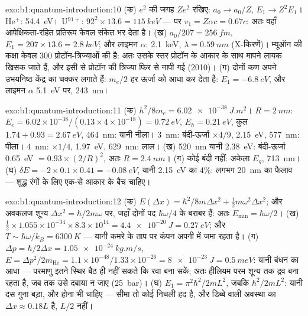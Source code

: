 \begin{solution}{exo:b1:quantum-introduction:10}
(क) $e^2$ की जगह $Ze^2$ रखिए: $a_0 \to a_0/Z$, $E_1 \to Z^2E_1$। He$^+$:
\qty{54.4}{eV}। U$^{91+}$: $92^2 \times 13.6 = \qty{115}{keV}$ --- पर $v_1 = Z\alpha c
= 0.67c$: अतः वहाँ आपेक्षिकता-रहित प्रतिरूप केवल संकेत भर देता है। (ख) $a_0/207
= \qty{256}{fm}$, $E_1 = 207 \times 13.6 = \qty{2.8}{keV}$; और लाइमन $\alpha$:
\qty{2.1}{keV}, $\lambda = \qty{0.59}{nm}$ (X-किरणें)। म्यूऑन की कक्षा केवल
$300$ प्रोटॉन-त्रिज्याओं की है: अतः उसके स्तर प्रोटॉन के आकार के साथ मापने
लायक खिसक जाते हैं, और इसी से प्रोटॉन की त्रिज्या फिर से नापी गई (2010)।
(ग) दोनों कण अपने उभयनिष्ठ केंद्र का चक्कर लगाते हैं: 
$m_e/2$ हर ऊर्जा को आधा कर देता है: $E_1 = \qty{-6.8}{eV}$, और लाइमन $\alpha$ \qty{5.1}{eV} पर, \qty{243}{nm}।
\end{solution}

\begin{solution}{exo:b1:quantum-introduction:11}
(क) $h^2/8m_e = \qty{6.02e-38}{J.m^2}$। $R = \qty{2}{nm}$: $E_e = 6.02 \times 10^{-38}/
(0.13 \times 4 \times 10^{-18}) = \qty{0.72}{eV}$, $E_h = \qty{0.21}{eV}$, कुल $1.74 +
0.93 = \qty{2.67}{eV}$, \qty{464}{nm}: यानी नीला। \qty{3}{nm}: बंदी-ऊर्जा $\times4/9$,
\qty{2.15}{eV}, \qty{577}{nm}: पीला। \qty{4}{nm}: $\times1/4$, \qty{1.97}{eV},
\qty{629}{nm}: लाल। (ख) \qty{520}{nm} यानी \qty{2.38}{eV}: बंदी-ऊर्जा \qty{0.65}{eV}
$= 0.93 \times (2/R)^2$, अतः $R = \qty{2.4}{nm}$। (ग) कोई बंदी नहीं: अकेला $E_g$,
\qty{713}{nm}। (घ) $\delta E = -2 \times 0.1 \times 0.41 = \qty{-0.08}{eV}$, यानी
\qty{2.15}{eV} का $4\%$: लगभग \qty{20}{nm} का फैलाव --- शुद्ध रंगों के लिए
एक-से आकार के बैच चाहिए।
\end{solution}

\begin{solution}{exo:b1:quantum-introduction:12}
(क) $E(\Delta x) = \hbar^2/8m\Delta x^2 + \tfrac12m\omega^2\Delta x^2$; और अवकलज शून्य
$\Delta x^2 = \hbar/2m\omega$ पर, जहाँ दोनों पद $\hbar\omega/4$ के बराबर हैं: अतः $E_{\min} =
\hbar\omega/2$। (ख) $\tfrac12 \times 1.055 \times 10^{-34} \times 8.3 \times 10^{14} = \qty{4.4e-20}{J}
= \qty{0.27}{eV}$; और $T \sim \hbar\omega/k_B = \qty{6300}{K}$ --- यानी कमरे के ताप
पर कंपन अपनी  में जमा रहता है। (ग) $\Delta p = \hbar/2\Delta x =
\qty{1.05e-24}{kg.m/s}$, $E = \Delta p^2/2m_{\mathrm{He}} = 1.1 \times 10^{-48}/1.33 \times
10^{-26} = \qty{8e-23}{J} = \qty{0.5}{meV}$: यानी बंधन का आधा --- परमाणु इतने
स्थिर बैठ ही नहीं सकते कि रवा बना सकें; अतः हीलियम परम शून्य तक द्रव बना
रहता है, जब तक उसे दबाया न जाए (\qty{25}{bar})। (घ) $E_1 = \pi^2\hbar^2/2mL^2$, जबकि
$\hbar^2/2mL^2$: यानी दस गुना बड़ा, और होना भी चाहिए --- सीमा तो कोई निचली
हद है, और डिब्बे वाली अवस्था का $\Delta x \approx 0.18L$ है, $L/2$ नहीं।
\end{solution}

